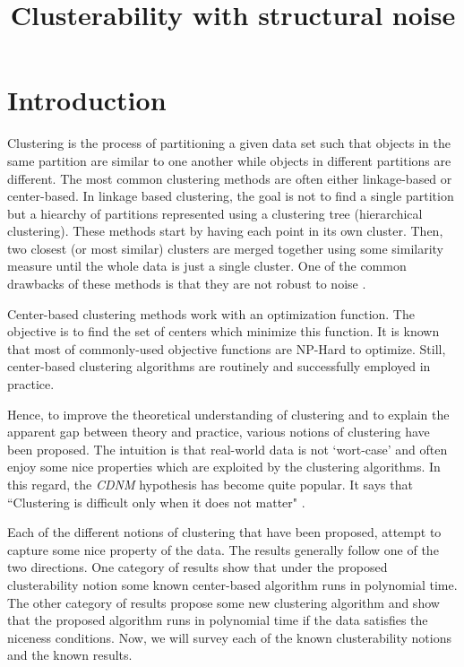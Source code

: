 \documentclass[11pt]{article}
\title{\LARGE Clusterability with structural noise}
\author{}
\begin{document}
\maketitle

\section{Introduction}
Clustering is the process of partitioning a given data set such that objects in the same partition are similar to one another while objects in different partitions are different. The most common clustering methods are often either linkage-based or center-based. In linkage based clustering, the goal is not to find a single partition but a hiearchy of partitions represented using a clustering tree (hierarchical clustering). These methods start by having each point in its own cluster. Then, two closest (or most similar) clusters are merged together using some similarity measure until the whole data is just a single cluster. One of the common drawbacks of these methods is that they are not robust to noise \cite{narasimhan2005q}. 

Center-based clustering methods work with an optimization function. The objective is to find the set of centers which minimize this function. It is known that most of commonly-used objective functions are NP-Hard to optimize. Still, center-based clustering algorithms are routinely and successfully employed in practice.

Hence, to improve the theoretical understanding of clustering and to explain the apparent gap between theory and practice, various notions of clustering have been proposed. The intuition is that real-world data is not `wort-case' and often enjoy some nice properties which are exploited by the clustering algorithms. In this regard, the \emph{CDNM} hypothesis has become quite popular. It says that ``Clustering is difficult only when it does not matter" \cite{daniely2012clustering}.    

Each of the different notions of clustering that have been proposed, attempt to capture some nice property of the data. The results generally follow one of the two directions. One category of results show that under the proposed clusterability notion some known center-based algorithm runs in polynomial time. The other category of results propose some new clustering algorithm and show that the proposed algorithm runs in polynomial time if the data satisfies the niceness conditions. Now, we will survey each of the known clusterability notions and the known results.
\end{document}
